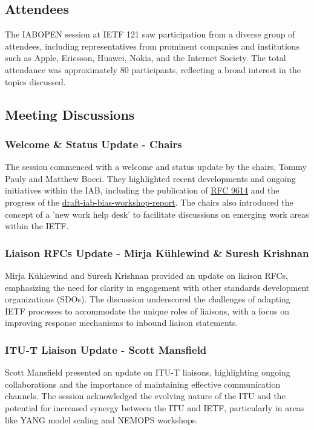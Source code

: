 \documentclass{article}
\begin{document}
\subsection{Attendees}

The IABOPEN session at IETF 121 saw participation from a diverse group of attendees, including representatives from prominent companies and institutions such as Apple, Ericsson, Huawei, Nokia, and the Internet Society. The total attendance was approximately 80 participants, reflecting a broad interest in the topics discussed.

\subsection{Meeting Discussions}

\subsubsection{Welcome \& Status Update - Chairs}

The session commenced with a welcome and status update by the chairs, Tommy Pauly and Matthew Bocci. They highlighted recent developments and ongoing initiatives within the IAB, including the publication of \href{https://datatracker.ietf.org/doc/rfc9614/}{RFC 9614} and the progress of the \href{https://datatracker.ietf.org/doc/draft-iab-bias-workshop-report/}{draft-iab-bias-workshop-report}. The chairs also introduced the concept of a 'new work help desk' to facilitate discussions on emerging work areas within the IETF.

\subsubsection{Liaison RFCs Update - Mirja Kühlewind \& Suresh Krishnan}

Mirja Kühlewind and Suresh Krishnan provided an update on liaison RFCs, emphasizing the need for clarity in engagement with other standards development organizations (SDOs). The discussion underscored the challenges of adapting IETF processes to accommodate the unique roles of liaisons, with a focus on improving response mechanisms to inbound liaison statements.

\subsubsection{ITU-T Liaison Update - Scott Mansfield}

Scott Mansfield presented an update on ITU-T liaisons, highlighting ongoing collaborations and the importance of maintaining effective communication channels. The session acknowledged the evolving nature of the ITU and the potential for increased synergy between the ITU and IETF, particularly in areas like YANG model scaling and NEMOPS workshops.
\end{document}
